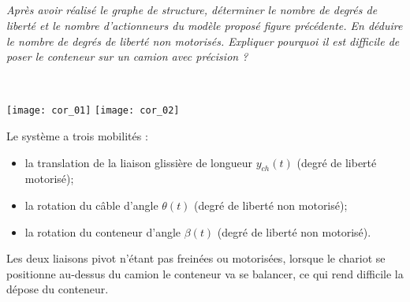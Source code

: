 \documentclass[10pt,fleqn]{article} %
\begin{document}
\subparagraph{\label{q13}}
\textit{Après avoir réalisé le graphe de structure, déterminer le nombre de degrés de liberté et le nombre d’actionneurs du modèle proposé figure précédente. En
déduire le nombre de degrés de liberté non motorisés. Expliquer pourquoi il est difficile de poser le conteneur
sur un camion avec précision ?}
\ifprof
\begin{corrige} ~\\

\begin{center}
\texttt{[image: cor\_01]}
\hfill
\texttt{[image: cor\_02]}
\end{center}

Le système a trois mobilités : 
\begin{itemize}
\item la translation de la liaison glissière de longueur $y_{ch}(t)$ (degré de liberté motorisé);
\item la rotation du câble d'angle $\theta(t)$ (degré de liberté non motorisé);
\item la rotation du conteneur d'angle $\beta(t)$ (degré de liberté non motorisé). 
\end{itemize}

Les deux liaisons pivot n'étant pas freinées ou motorisées, lorsque le chariot se positionne au-dessus du camion le conteneur va se balancer, ce qui rend difficile la dépose du conteneur. 

\end{corrige}
\else
\fi
\end{document}
